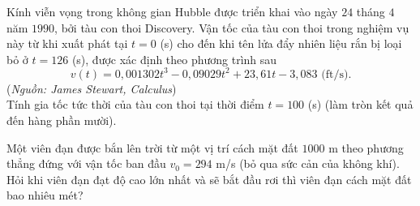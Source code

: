 \begin{bt}%
	Kính viễn vọng trong không gian Hubble được triển khai vào ngày $24$ tháng $4$ năm $1990$, bởi tàu con thoi Discovery. Vận tốc của tàu con thoi trong nghiệm vụ này từ khi xuất phát tại $t=0$ (s) cho đến khi tên lửa đẩy nhiên liệu rắn bị loại bỏ ở $t=126$ (s), được xác định theo phương trình sau
	$$v(t)=0{,}001302 t^3-0{,}09029 t^2+23{,}61 t-3{,}083\text{ (ft/s)}.$$
	(\textit{Nguồn: James Stewart, Calculus})\\
	Tính gia tốc tức  thời của tàu con thoi tại thời điểm $t=100$ (s) (làm tròn kết quả đến hàng phần mười).
\end{bt}

\begin{bt}%
	Một viên đạn được bắn lên trời từ một vị trí cách mặt đất $1000$ m theo phương thẳng đứng với vận tốc ban đầu $v_0=294$ m/s (bỏ qua sức cản của không khí). Hỏi khi viên đạn đạt độ cao lớn nhất và sẽ bắt đầu rơi thì viên đạn cách mặt đất bao nhiêu mét?
\end{bt}

